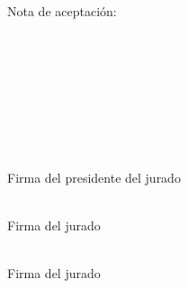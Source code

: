 
{\hfill
    \begin{minipage}{0.5\textwidth}
        \centering
        
        Nota de aceptaci\'on:\\
        \vspace*{0.8cm}
        
        \hrulefill\\[0.2cm]
        \hrulefill\\[0.2cm]
        \hrulefill\\[0.2cm]
        \hrulefill\\[0.2cm]
        \hrulefill\\[0.2cm]
        \hrulefill\\
        \vspace*{4cm}
        
        \hrulefill\\
        Firma del presidente del jurado\\
        \vspace*{2.5cm}
        
        \hrulefill\\
        Firma del jurado\\
        \vspace*{2.5cm}
        
        \hrulefill\\
        Firma del jurado\\
        \vspace*{2.5cm}
    
    \end{minipage}
}
\newpage